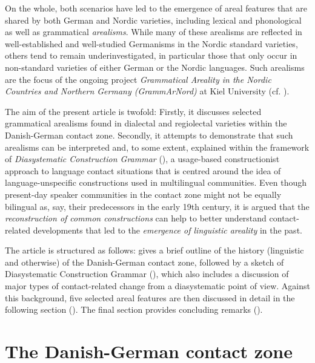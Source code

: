 \documentclass[output=paper]{langsci/langscibook}
\begin{document}
On the whole, both scenarios have led to the emergence of areal features that are shared by both German and Nordic varieties, including lexical and phonological as well as grammatical \textit{arealisms}. While many of these arealisms are reflected in well-established and well-studied Germanisms in the Nordic standard varieties, others tend to remain underinvestigated, in particular those that only occur in non-standard varieties of either German or the Nordic languages. Such arealisms are the focus of the ongoing project \textit{Grammatical Areality in the Nordic Countries and Northern Germany (GrammArNord)} at Kiel University (cf. \citealt{Hoder.2016a}).

\begin{sloppypar}
The aim of the present article is twofold: Firstly, it discusses selected grammatical arealisms found in dialectal and regiolectal varieties within the Danish-German contact zone. Secondly, it attempts to demonstrate that such arealisms can be interpreted and, to some extent, explained within the framework of \textit{Diasystematic Construction Grammar} (\citealt{Hoder.2012, Hoder.2014, Hoder.2018}), a usage-based constructionist approach to language contact situations that is centred around the idea of language-unspecific constructions used in multilingual communities. Even though present-day speaker communities in the contact zone might not be equally bilingual as, say, their predecessors in the early 19th century, it is argued that the \textit{reconstruction of common constructions} can help to better understand contact-related developments that led to the \textit{emergence of linguistic areality} in the past.
\end{sloppypar}

The article is structured as follows:  gives a brief outline of the history (linguistic and otherwise) of the Danish-German contact zone, followed by a sketch of Diasystematic Construction Grammar (), which also includes a discussion of major types of contact-related change from a diasystematic point of view. Against this background, five selected areal features are then discussed in detail in the following section (). The final section provides concluding remarks ().


\section{The Danish-German contact zone}
\label{sec:hoeder:2}
\end{document}

